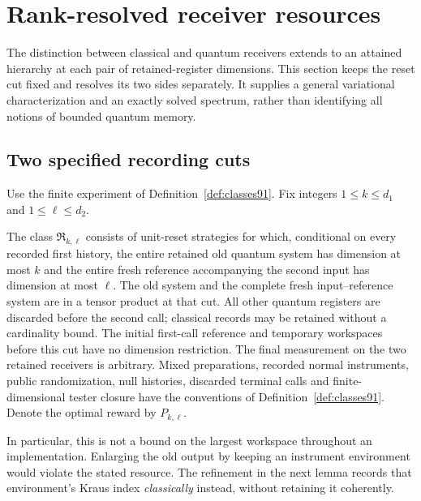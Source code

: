 \section{Rank-resolved receiver resources}
\label{sec:rankmemory92}
The distinction between classical and quantum receivers extends to an
attained hierarchy at each pair of retained-register dimensions.  This
section keeps the reset cut fixed and resolves its two sides separately.
It supplies a general variational characterization and an exactly solved
spectrum, rather than identifying all notions of bounded quantum memory.

\subsection{Two specified recording cuts}
Use the finite experiment of Definition~\ref{def:classes91}.
Fix integers $1\le k\le d_1$ and $1\le \ell\le d_2$.
\begin{definition}\label{def:rankclass92}
The class $\mathfrak R_{k,\ell}$ consists of unit-reset strategies for
which, conditional on every recorded first history, the entire retained
old quantum system has dimension at most $k$ and the entire fresh
reference accompanying the second input has dimension at most $\ell$.
The old system and the complete fresh input--reference system are in a
tensor product at that cut.  All other quantum registers are discarded
before the second call; classical records may be retained without a
cardinality bound.  The initial first-call reference and temporary
workspaces before this cut have no dimension restriction.  The final
measurement on the two retained receivers is arbitrary.
Mixed preparations, recorded normal instruments, public randomization,
null histories, discarded terminal calls and finite-dimensional tester
closure have the conventions of Definition~\ref{def:classes91}.
Denote the optimal reward by $P_{k,\ell}$.
\end{definition}
In particular, this is not a bound on the largest workspace throughout
an implementation.  Enlarging the old output by keeping an instrument
environment would violate the stated resource.  The refinement in the
next lemma records that environment's Kraus index \emph{classically}
instead, without retaining it coherently.

